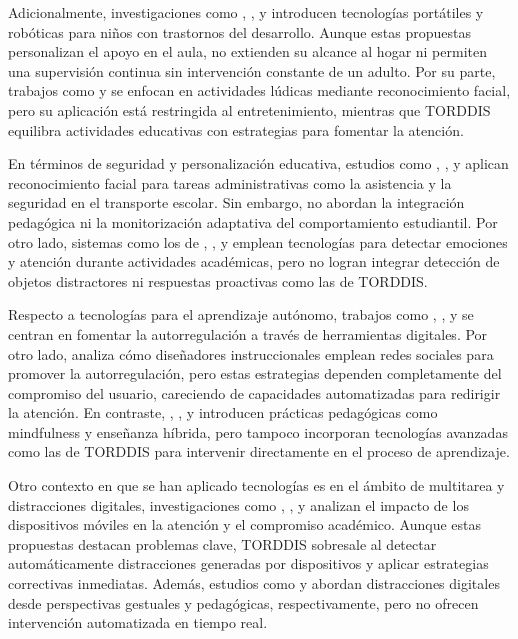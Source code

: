 \documentclass[a4paper,fleqn]{cas-sc}
\begin{document}
			Adicionalmente, investigaciones como \cite{Berrezueta-Guzman2021}, \cite{VilliersRader2021}, y \cite{Washington2016AWereable} introducen tecnologías portátiles y robóticas para niños con trastornos del desarrollo. Aunque estas propuestas personalizan el apoyo en el aula, no extienden su alcance al hogar ni permiten una supervisión continua sin intervención constante de un adulto. Por su parte, trabajos como \cite{Muller2018ArchnSmile} y \cite{Nguyen2019} se enfocan en actividades lúdicas mediante reconocimiento facial, pero su aplicación está restringida al entretenimiento, mientras que TORDDIS equilibra actividades educativas con estrategias para fomentar la atención.
			
			En términos de seguridad y personalización educativa, estudios como \cite{Hachad2020}, \cite{James2019}, y \cite{Boumiza2017} aplican reconocimiento facial para tareas administrativas como la asistencia y la seguridad en el transporte escolar. Sin embargo, no abordan la integración pedagógica ni la monitorización adaptativa del comportamiento estudiantil. Por otro lado, sistemas como los de \cite{DaCosta2023}, \cite{Kumar2024Zoom}, y \cite{Narkhede2023} emplean tecnologías para detectar emociones y atención durante actividades académicas, pero no logran integrar detección de objetos distractores ni respuestas proactivas como las de TORDDIS.
			
			Respecto a tecnologías para el aprendizaje autónomo, trabajos como \cite{Bembich2016Future}, \cite{Roberts2020Task}, y \cite{Peters2003Self} se centran en fomentar la autorregulación a través de herramientas digitales. Por otro lado, \cite{Muljana2022Instructional} analiza cómo diseñadores instruccionales emplean redes sociales para promover la autorregulación, pero estas estrategias dependen completamente del compromiso del usuario, careciendo de capacidades automatizadas para redirigir la atención. En contraste, \cite{Palmer2022impact}, \cite{Adcroft2018Developing}, y \cite{Salter2014Exploring} introducen prácticas pedagógicas como mindfulness y enseñanza híbrida, pero tampoco incorporan tecnologías avanzadas como las de TORDDIS para intervenir directamente en el proceso de aprendizaje.
			
			Otro contexto en que se han aplicado tecnologías es en el ámbito de multitarea y distracciones digitales, investigaciones como \cite{Hartley2022Smartphone}, \cite{Labar2019Interplay}, y \cite{Farsani2020} analizan el impacto de los dispositivos móviles en la atención y el compromiso académico. Aunque estas propuestas destacan problemas clave, TORDDIS sobresale al detectar automáticamente distracciones generadas por dispositivos y aplicar estrategias correctivas inmediatas. Además, estudios como \cite{Erazo2016Easing} y \cite{Wang2022Empowering} abordan distracciones digitales desde perspectivas gestuales y pedagógicas, respectivamente, pero no ofrecen intervención automatizada en tiempo real.
			
\end{document}
